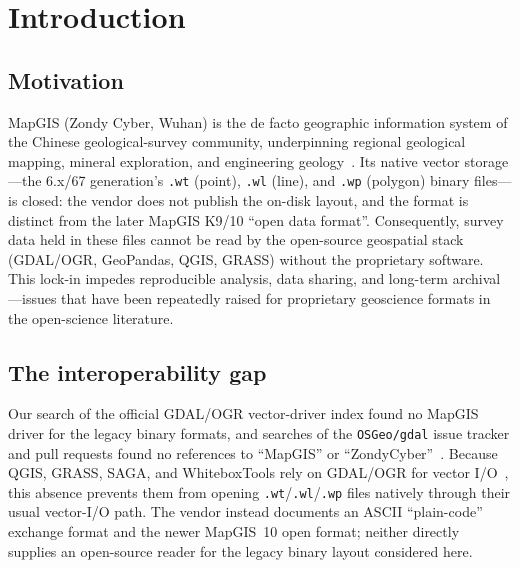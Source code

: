 \documentclass[11pt,a4paper]{article}
\begin{document}
\section{Introduction}

\subsection{Motivation}
MapGIS (Zondy Cyber, Wuhan) is the de facto geographic information system of the Chinese geological-survey community, underpinning regional geological mapping, mineral exploration, and engineering geology~\cite{ma2012,han2012}. Its native vector storage---the 6.x/67 generation's \texttt{.wt} (point), \texttt{.wl} (line), and \texttt{.wp} (polygon) binary files---is closed: the vendor does not publish the on-disk layout, and the format is distinct from the later MapGIS K9/10 ``open data format''. Consequently, survey data held in these files cannot be read by the open-source geospatial stack (GDAL/OGR, GeoPandas, QGIS, GRASS) without the proprietary software. This lock-in impedes reproducible analysis, data sharing, and long-term archival---issues that have been repeatedly raised for proprietary geoscience formats in the open-science literature.

\subsection{The interoperability gap}
Our search of the official GDAL/OGR vector-driver index found no MapGIS driver for the legacy binary formats, and searches of the \texttt{OSGeo/gdal} issue tracker and pull requests found no references to ``MapGIS'' or ``ZondyCyber''~\cite{gdalwebsite}. Because QGIS, GRASS, SAGA, and WhiteboxTools rely on GDAL/OGR for vector I/O~\cite{warmerdam2008}, this absence prevents them from opening \texttt{.wt}/\texttt{.wl}/\texttt{.wp} files natively through their usual vector-I/O path. The vendor instead documents an ASCII ``plain-code'' exchange format and the newer MapGIS~10 open format; neither directly supplies an open-source reader for the legacy binary layout considered here.
\end{document}
